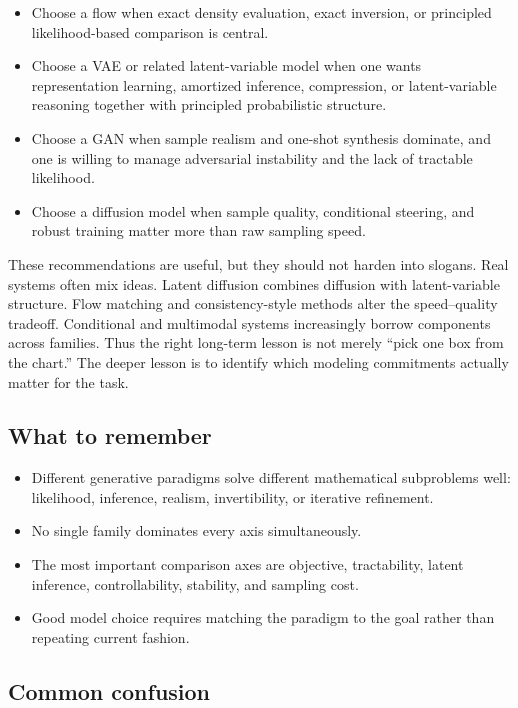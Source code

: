 \begin{itemize}
    \item Choose a flow when exact density evaluation, exact inversion, or principled likelihood-based comparison is central.
    \item Choose a VAE or related latent-variable model when one wants representation learning, amortized inference, compression, or latent-variable reasoning together with principled probabilistic structure.
    \item Choose a GAN when sample realism and one-shot synthesis dominate, and one is willing to manage adversarial instability and the lack of tractable likelihood.
    \item Choose a diffusion model when sample quality, conditional steering, and robust training matter more than raw sampling speed.
\end{itemize}

These recommendations are useful, but they should not harden into slogans.
Real systems often mix ideas.
Latent diffusion combines diffusion with latent-variable structure.
Flow matching and consistency-style methods alter the speed--quality tradeoff.
Conditional and multimodal systems increasingly borrow components across families.
Thus the right long-term lesson is not merely ``pick one box from the chart.''
The deeper lesson is to identify which modeling commitments actually matter for the task.

\subsection*{What to remember}

\begin{itemize}
    \item Different generative paradigms solve different mathematical subproblems well: likelihood, inference, realism, invertibility, or iterative refinement.
    \item No single family dominates every axis simultaneously.
    \item The most important comparison axes are objective, tractability, latent inference, controllability, stability, and sampling cost.
    \item Good model choice requires matching the paradigm to the goal rather than repeating current fashion.
\end{itemize}

\subsection*{Common confusion}

